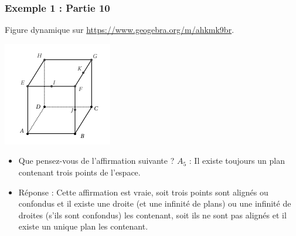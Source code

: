 \documentclass[xcolor=svgnames,t,final]{beamer}
\begin{document}
\begin{frame}

\frametitle{Exemple 1 : Partie 10}

Figure dynamique sur \href{https://www.geogebra.org/m/ahkmk9br}{https://www.geogebra.org/m/ahkmk9br}.


\begin{center}
\includegraphics[scale=0.4]{images/exemple1.png}
\end{center}

\begin{itemize}
\pause \item {\color{blue}  Que pensez-vous de l'affirmation suivante ? $A_{5}$ : \og{} Il existe toujours un plan contenant trois points de l'espace. \fg{}}
\pause \item {\color{red} Réponse :  Cette affirmation est vraie,  soit trois points sont alignés ou confondus et il existe une droite (et une infinité de plans) ou une infinité de droites  (s'ils sont confondus) les contenant, soit ils ne sont pas alignés et il existe  un unique plan les contenant.
}
\end{itemize}


\end{frame}
\end{document}
